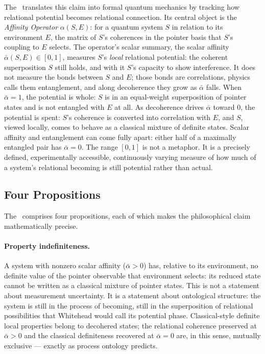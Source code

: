 The \RCF\ translates this claim into formal quantum mechanics by tracking
how relational potential becomes relational connection.
Its central object is the \emph{Affinity Operator} $\alpha(S,E)$: for a
quantum system $S$ in relation to its environment $E$, the matrix of
$S$'s coherences in the pointer basis that $S$'s coupling to $E$ selects.
The operator's scalar summary, the scalar affinity $\bar\alpha(S,E) \in [0,1]$,
measures $S$'s \emph{local} relational potential: the coherent
superposition $S$ still holds, and with it $S$'s capacity to show
interference.
It does not measure the bonds between $S$ and $E$; those bonds are
correlations, physics calls them entanglement, and along decoherence
they grow as $\bar\alpha$ falls.
When $\bar\alpha = 1$, the potential is whole: $S$ is in an equal-weight
superposition of pointer states and is not entangled with $E$ at all.
As decoherence drives $\bar\alpha$ toward $0$, the potential is spent:
$S$'s coherence is converted into correlation with $E$, and $S$, viewed
locally, comes to behave as a classical mixture of definite states.
Scalar affinity and entanglement can come fully apart: either half of a
maximally entangled pair has $\bar\alpha = 0$.
The range $[0,1]$ is not a metaphor.
It is a precisely defined, experimentally accessible, continuously
varying measure of how much of a system's relational becoming is still
potential rather than actual.

\subsection{Four Propositions}

The \RCF\ comprises four propositions, each of which makes the
philosophical claim mathematically precise.

\paragraph{Property indefiniteness.}
A system with nonzero scalar affinity ($\bar\alpha > 0$) has, relative to
its environment, no definite value of the pointer observable that
environment selects: its reduced state cannot be written as a classical
mixture of pointer states.
This is not a statement about measurement uncertainty.
It is a statement about ontological structure: the system is still in
the process of becoming, still in the superposition of relational
possibilities that Whitehead would call its potential phase.
Classical-style definite local properties belong to decohered states;
the relational coherence preserved at $\bar\alpha > 0$ and the classical
definiteness recovered at $\bar\alpha = 0$ are, in this sense, mutually
exclusive --- exactly as process ontology predicts.

